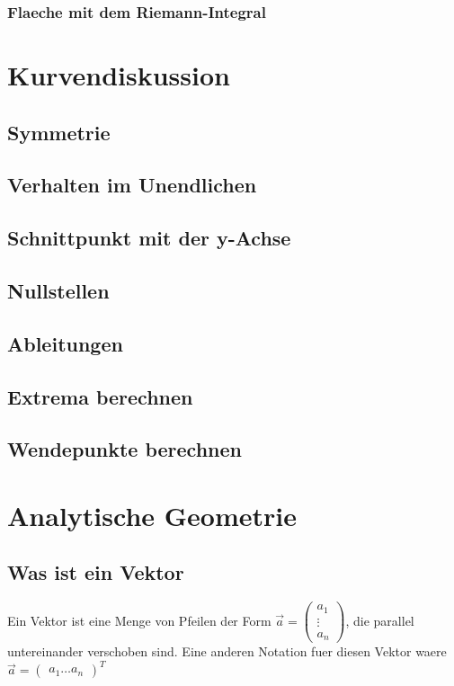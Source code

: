 \documentclass[a4paper]{article} %
\begin{document}
	\subsubsection{Flaeche mit dem Riemann-Integral}
	\section{Kurvendiskussion}
	\subsection{Symmetrie}
	\subsection{Verhalten im Unendlichen}
	\subsection{Schnittpunkt mit der y-Achse}
	\subsection{Nullstellen}
	\subsection{Ableitungen}
	\subsection{Extrema berechnen}
	\subsection{Wendepunkte berechnen}
	\section{Analytische Geometrie}
	\subsection{Was ist ein Vektor}
	Ein Vektor ist eine Menge von Pfeilen der Form $\vec{a} = \begin{pmatrix} a_1 \\ \vdots \\ a_n \end{pmatrix} $, die parallel untereinander verschoben sind.
	Eine anderen Notation fuer diesen Vektor waere $\vec{a} = \begin{pmatrix} a_1  \hdots  a_n \end{pmatrix}^T $
\end{document}
